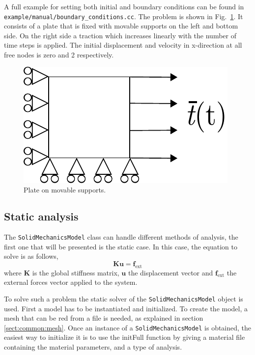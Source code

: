 \documentclass[a4paper,11pt]{book}
\newcommand{\code}[1]{\texttt{#1}}
\renewcommand{\vec}[1]{\ensuremath{\boldsymbol{#1}}}
\newcommand{\mat}[1]{\ensuremath{\boldsymbol{#1}}}
\newcommand{\st}[1]{{\mathrm{#1}}}
\begin{document}
A full example for setting both initial and boundary conditions can be found in \code{example/manual/boundary\_conditions.cc}. The problem is shown in Fig.~\ref{fig:smm:bc_and_ic}. It consists of a plate that is fixed with movable supports on the left and bottom side. On the right side a traction which increases linearly with the number of time steps is applied. The initial displacement and velocity in x-direction at all free nodes is zero and 2 respectively.
\begin{figure}[!htb]
  \centering
  \includegraphics[scale=0.8]{figures/bc_and_ic_example}
  \caption{Plate on movable supports.\label{fig:smm:bc_and_ic}}
\end{figure}

\subsection{Static analysis\label{sect:smm:static}}

The \code{SolidMechanicsModel}  class can handle different  methods of analysis,
the first  one that will  be presented  is the static  case.  In this  case, the
equation to solve is as follows,
\begin{equation}\label{eqn:smm:static}
  \mat{K} \vec{u} = \vec{f_{\st{ext}}}
\end{equation}
where  $\mat{K}$ is  the  global stiffness  matrix,  $\vec{u}$ the  displacement
vector  and  $\vec{f_{\st{ext}}}$ the  external  forces  vector  applied to  the
system.


To     solve    such     a    problem     the    static     solver     of    the
\code{SolidMechanicsModel}  object is used.   First a
model has to be instantiated and  initialized.  To create the model, a mesh that
can   be   red   from   a   file   is   needed,   as   explained   in   section
\ref{sect:common:mesh}.   Once an  instance of  a  \code{SolidMechanicsModel} is
obtained,   the    easiest   way    to   initialize   it    is   to    use   the
initFull function by  giving a material file
containing the material parameters, and a type of analysis.
\end{document}
